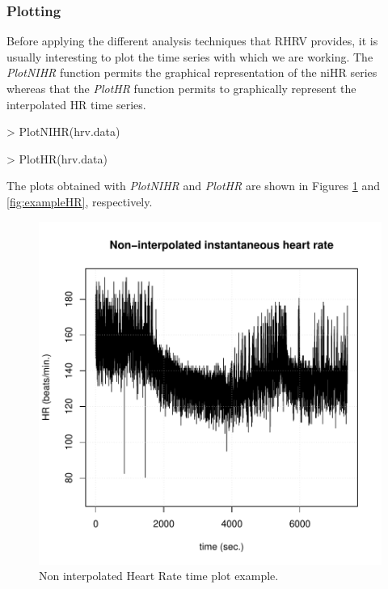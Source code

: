 \documentclass[12pt,lot, lof]{puthesis}
\begin{document}
\subsubsection{Plotting} Before applying the different analysis techniques that 
RHRV provides, it 
is usually interesting to plot the time series with which we are working. The 
\textit{PlotNIHR} function permits the graphical representation of the 
\gls{niHR} series whereas that the \textit{PlotHR} function permits to 
graphically represent the interpolated \gls{HR} time series.\\
\begin{Schunk}
\begin{Sinput}
> PlotNIHR(hrv.data)
\end{Sinput}
\end{Schunk}
\begin{Schunk}
\begin{Sinput}
> PlotHR(hrv.data)
\end{Sinput}
\end{Schunk}
The plots obtained with \textit{PlotNIHR} and \textit{PlotHR} are shown in 
Figures \ref{fig:exampleNIHR} and \ref{fig:exampleHR}, respectively.\\

\begin{figure}[h]
\centering
\includegraphics{figures/tutorial-plottingNIHR}
\caption{Non interpolated Heart Rate time plot example.\label{fig:exampleNIHR}}
\end{figure}
\end{document}
